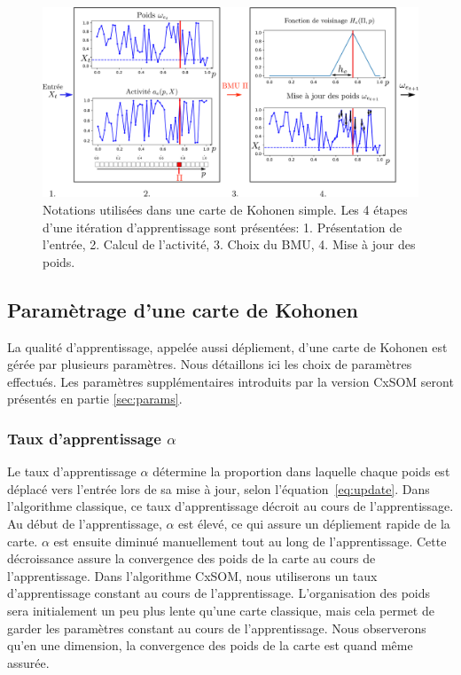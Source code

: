 \begin{figure}
\centering
\includegraphics[width=\textwidth]{one_map_one_layer2.pdf}
\caption{Notations utilisées dans une carte de Kohonen simple. Les 4 étapes d'une itération d'apprentissage sont présentées: 1. Présentation de l'entrée, 2. Calcul de l'activité, 3. Choix du BMU, 4. Mise à jour des poids.}
\label{fig:one_map_not}
\end{figure}


\subsection{Paramètrage d'une carte de Kohonen}
La qualité d'apprentissage, appelée aussi dépliement, d'une carte de Kohonen est gérée par plusieurs paramètres. Nous détaillons ici les choix de paramètres effectués. Les paramètres supplémentaires introduits par la version CxSOM seront présentés en partie \ref{sec:params}.

\subsubsection{Taux d'apprentissage $\alpha$}
Le taux d'apprentissage $\alpha$ détermine la proportion dans laquelle chaque poids est déplacé vers l'entrée lors de sa mise à jour, selon l'équation~\ref{eq:update}. Dans l'algorithme classique, ce taux d'apprentissage décroit au cours de l'apprentissage. Au début de l'apprentissage, $\alpha$ est élevé, ce qui assure un dépliement rapide de la carte. $\alpha$ est ensuite diminué manuellement tout au long de l'apprentissage. Cette décroissance assure la convergence des poids de la carte au cours de l'apprentissage.
Dans l'algorithme CxSOM, nous utiliserons un taux d'apprentissage constant au cours de l'apprentissage. L'organisation des poids sera initialement un peu plus lente qu'une carte classique, mais cela permet de garder les paramètres constant au cours de l'apprentissage.
Nous observerons qu'en une dimension, la convergence des poids de la carte est quand même assurée.


